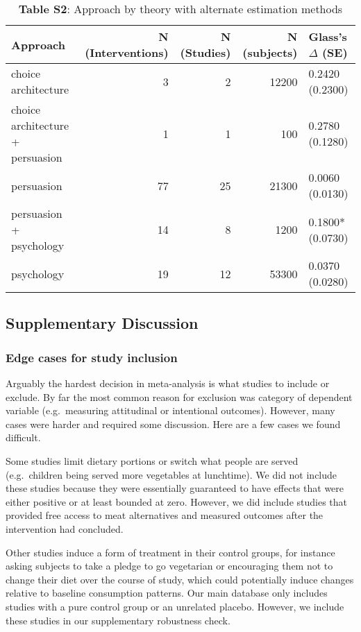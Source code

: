 \documentclass[sn-nature,pdflatex]{sn-jnl}
\begin{document}
\begin{table}[!h]
\centering
\caption{\label{tab:supp_table_two}\textbf{Table S2}: Approach by theory with alternate estimation methods }
\centering
\begin{tabular}[t]{lrrrl}
\toprule
Approach & N (Interventions) & N (Studies) & N (subjects) & Glass's $\Delta$ (SE)\\
\midrule
choice architecture & 3 & 2 & 12200 & 0.2420 (0.2300)\\
choice architecture + persuasion & 1 & 1 & 100 & 0.2780 (0.1280)\\
persuasion & 77 & 25 & 21300 & 0.0060 (0.0130)\\
persuasion + psychology & 14 & 8 & 1200 & 0.1800* (0.0730)\\
psychology & 19 & 12 & 53300 & 0.0370 (0.0280)\\
\bottomrule
\end{tabular}
\end{table}

\subsection{Supplementary Discussion}\label{supplementary-discussion}

\subsubsection{Edge cases for study
inclusion}\label{edge-cases-for-study-inclusion}

Arguably the hardest decision in meta-analysis is what studies to
include or exclude. By far the most common reason for exclusion was
category of dependent variable (e.g.~measuring attitudinal or
intentional outcomes). However, many cases were harder and required some
discussion. Here are a few cases we found difficult.

Some studies limit dietary portions or switch what people are served
(e.g.~children being served more vegetables at lunchtime). We did not
include these studies because they were essentially guaranteed to have
effects that were either positive or at least bounded at zero. However,
we did include studies that provided free access to meat alternatives
\citep{acharya2004, bianchi2022} and measured outcomes after the
intervention had concluded.

Other studies induce a form of treatment in their control groups, for
instance asking subjects to take a pledge to go vegetarian or
encouraging them not to change their diet over the course of study,
which could potentially induce changes relative to baseline consumption
patterns. Our main database only includes studies with a pure control
group or an unrelated placebo. However, we include these studies in our
supplementary robustness check.
\end{document}
